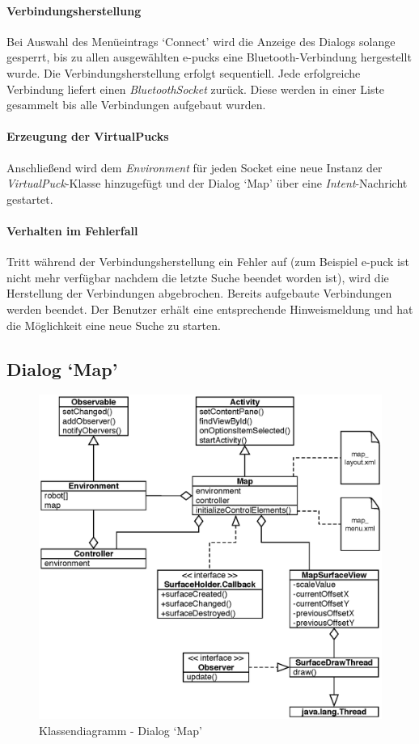 \documentclass[10pt,a4paper]{article}
\begin{document}
	\paragraph*{Verbindungsherstellung}
	Bei Auswahl des Menüeintrags `Connect' wird die Anzeige des Dialogs solange gesperrt, bis zu allen ausgewählten e-pucks eine Bluetooth-Verbindung
	hergestellt wurde. Die Verbindungsherstellung erfolgt sequentiell. Jede erfolgreiche Verbindung liefert einen \textit{BluetoothSocket} zurück.
	Diese werden in einer Liste gesammelt bis alle Verbindungen aufgebaut wurden.
	
	\paragraph*{Erzeugung der VirtualPucks}
	Anschließend wird dem \textit{Environment} für jeden Socket eine neue Instanz der \textit{VirtualPuck}-Klasse hinzugefügt und der Dialog `Map' über
	eine \textit{Intent}-Nachricht gestartet.
	
	\paragraph*{Verhalten im Fehlerfall}
	Tritt während der Verbindungsherstellung ein Fehler auf (zum Beispiel e-puck ist nicht mehr verfügbar nachdem die letzte Suche beendet worden
	ist), wird die Herstellung der Verbindungen abgebrochen. Bereits aufgebaute Verbindungen werden beendet. Der Benutzer erhält eine entsprechende
	Hinweismeldung und hat die Möglichkeit eine neue Suche zu starten.
	
	\subsection*{Dialog `Map'}
	\label{subsec:dialog_map}
	
	\begin{figure}[h]
			\centering
			\includegraphics[width=14cm]{images/entwurf_map.eps}
  			\caption{Klassendiagramm - Dialog `Map'}
  			\label{fig:dialog_map}
  	\end{figure}
	
\end{document}

